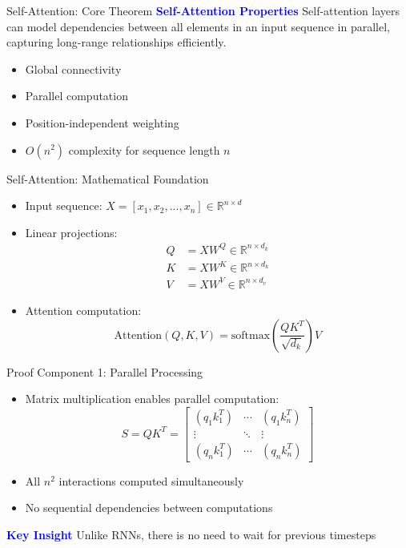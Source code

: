 \documentclass[serif, aspectratio=169]{beamer}
\begin{document}
\begin{frame}{Self-Attention: Core Theorem}
    \textcolor{blue}{\textbf{Self-Attention Properties}}
    \newline
        Self-attention layers can model dependencies between all elements in an input sequence in parallel, capturing long-range relationships efficiently.

    \begin{itemize}
            \item Global connectivity
            \item Parallel computation
            \item Position-independent weighting
            \item $O(n^2)$ complexity for sequence length $n$
    \end{itemize}
\end{frame}

\begin{frame}{Self-Attention: Mathematical Foundation}
    \begin{itemize}
        \item Input sequence: $X = [x_1, x_2, ..., x_n] \in \mathbb{R}^{n \times d}$
        \item Linear projections:
        \begin{align*}
            Q &= XW^Q \in \mathbb{R}^{n \times d_k} \\
            K &= XW^K \in \mathbb{R}^{n \times d_k} \\
            V &= XW^V \in \mathbb{R}^{n \times d_v}
        \end{align*}
        \item Attention computation:
        \begin{equation*}
            \text{Attention}(Q, K, V) = \text{softmax}\left(\frac{QK^T}{\sqrt{d_k}}\right)V
        \end{equation*}
    \end{itemize}
\end{frame}

\begin{frame}{Proof Component 1: Parallel Processing}
    \begin{itemize}
        \item Matrix multiplication enables parallel computation:
        \begin{equation*}
            S = QK^T = \begin{bmatrix}
            (q_1k_1^T) & \cdots & (q_1k_n^T) \\
            \vdots & \ddots & \vdots \\
            (q_nk_1^T) & \cdots & (q_nk_n^T)
            \end{bmatrix}
        \end{equation*}
        \item All $n^2$ interactions computed simultaneously
        \item No sequential dependencies between computations
    \end{itemize}
    \textcolor{blue}{\textbf{Key Insight}}
    \newline
        Unlike RNNs, there is no need to wait for previous timesteps
\end{frame}
\end{document}
